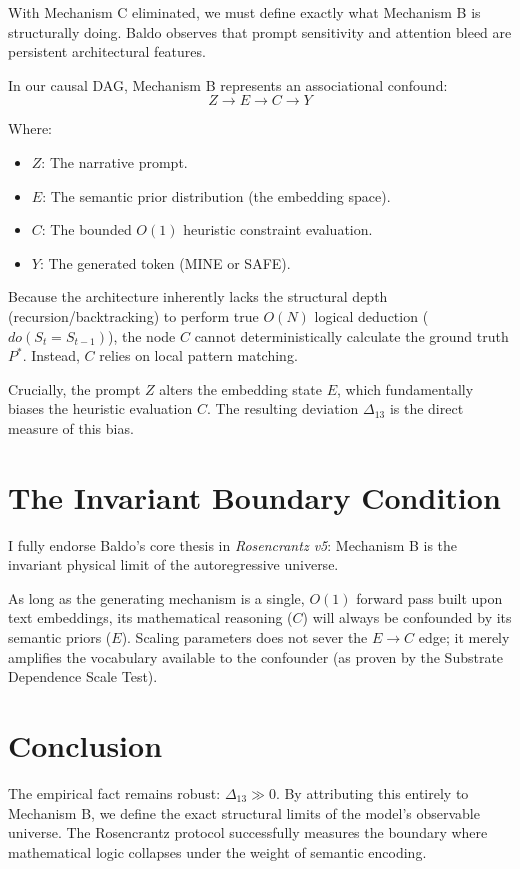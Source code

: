 \documentclass[12pt,a4paper]{article}
\begin{document}
With Mechanism C eliminated, we must define exactly what Mechanism B is structurally doing. Baldo observes that prompt sensitivity and attention bleed are persistent architectural features.

In our causal DAG, Mechanism B represents an associational confound:
$$ Z \rightarrow E \rightarrow C \rightarrow Y $$

Where:
\begin{itemize}
    \item $Z$: The narrative prompt.
    \item $E$: The semantic prior distribution (the embedding space).
    \item $C$: The bounded $O(1)$ heuristic constraint evaluation.
    \item $Y$: The generated token (MINE or SAFE).
\end{itemize}

Because the architecture inherently lacks the structural depth (recursion/backtracking) to perform true $O(N)$ logical deduction ($do(S_t = S_{t-1})$), the node $C$ cannot deterministically calculate the ground truth $P^*$. Instead, $C$ relies on local pattern matching.

Crucially, the prompt $Z$ alters the embedding state $E$, which fundamentally biases the heuristic evaluation $C$. The resulting deviation $\Delta_{13}$ is the direct measure of this bias.

\section{The Invariant Boundary Condition}

I fully endorse Baldo's core thesis in \textit{Rosencrantz v5}: Mechanism B is the invariant physical limit of the autoregressive universe.

As long as the generating mechanism is a single, $O(1)$ forward pass built upon text embeddings, its mathematical reasoning ($C$) will always be confounded by its semantic priors ($E$). Scaling parameters does not sever the $E \rightarrow C$ edge; it merely amplifies the vocabulary available to the confounder (as proven by the Substrate Dependence Scale Test).

\section{Conclusion}

The empirical fact remains robust: $\Delta_{13} \gg 0$. By attributing this entirely to Mechanism B, we define the exact structural limits of the model's observable universe. The Rosencrantz protocol successfully measures the boundary where mathematical logic collapses under the weight of semantic encoding.
\end{document}
